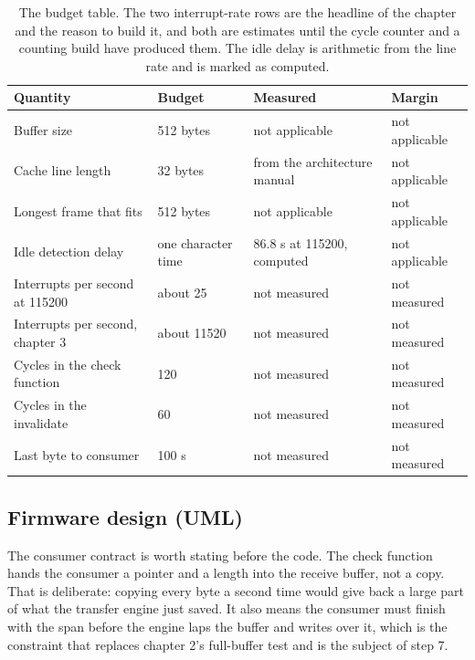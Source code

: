 \begin{table}[H]\centering\small
\begin{tabular}{p{44mm}p{28mm}p{28mm}p{30mm}}
\toprule
Quantity & Budget & Measured & Margin \\
\midrule
Buffer size & 512 bytes & not applicable & not applicable \\
Cache line length & 32 bytes & from the architecture manual & not applicable \\
Longest frame that fits & 512 bytes & not applicable & not applicable \\
Idle detection delay & one character time & 86.8 \textmu{}s at 115200, computed & not applicable \\
Interrupts per second at 115200 & about 25 & not measured & not measured \\
Interrupts per second, chapter 3 & about 11520 & not measured & not measured \\
Cycles in the check function & 120 & not measured & not measured \\
Cycles in the invalidate & 60 & not measured & not measured \\
Last byte to consumer & 100 \textmu{}s & not measured & not measured \\
\bottomrule
\end{tabular}
\caption{The budget table. The two interrupt-rate rows are the headline of the chapter and the reason to build it, and both are estimates until the cycle counter and a counting build have produced them. The idle delay is arithmetic from the line rate and is marked as computed.}
\end{table}

\subsection*{Firmware design (UML)}


The consumer contract is worth stating before the code. The check function
hands the consumer a pointer and a length into the receive buffer, not a copy.
That is deliberate: copying every byte a second time would give back a large
part of what the transfer engine just saved. It also means the consumer must
finish with the span before the engine laps the buffer and writes over it, which
is the constraint that replaces chapter 2's full-buffer test and is the subject
of step 7.

